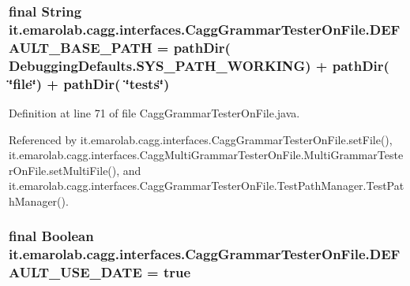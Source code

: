 \hypertarget{classit_1_1emarolab_1_1cagg_1_1interfaces_1_1CaggGrammarTesterOnFile_a2ab3d8af62c461ca52a0d174d6e0ed42}{
\subsubsection[{D\-E\-F\-A\-U\-L\-T\-\_\-\-B\-A\-S\-E\-\_\-\-P\-A\-T\-H}]{\setlength{\rightskip}{0pt plus 5cm}final String it.\-emarolab.\-cagg.\-interfaces.\-Cagg\-Grammar\-Tester\-On\-File.\-D\-E\-F\-A\-U\-L\-T\-\_\-\-B\-A\-S\-E\-\_\-\-P\-A\-T\-H = {\bf path\-Dir}( {\bf Debugging\-Defaults.\-S\-Y\-S\-\_\-\-P\-A\-T\-H\-\_\-\-W\-O\-R\-K\-I\-N\-G}) + {\bf path\-Dir}( \char`\"{}file\char`\"{}) + path\-Dir( \char`\"{}tests\char`\"{})\hspace{0.3cm}{\ttfamily [static]}}}\label{classit_1_1emarolab_1_1cagg_1_1interfaces_1_1CaggGrammarTesterOnFile_a2ab3d8af62c461ca52a0d174d6e0ed42}


Definition at line 71 of file Cagg\-Grammar\-Tester\-On\-File.\-java.



Referenced by it.\-emarolab.\-cagg.\-interfaces.\-Cagg\-Grammar\-Tester\-On\-File.\-set\-File(), it.\-emarolab.\-cagg.\-interfaces.\-Cagg\-Multi\-Grammar\-Tester\-On\-File.\-Multi\-Grammar\-Tester\-On\-File.\-set\-Multi\-File(), and it.\-emarolab.\-cagg.\-interfaces.\-Cagg\-Grammar\-Tester\-On\-File.\-Test\-Path\-Manager.\-Test\-Path\-Manager().

\hypertarget{classit_1_1emarolab_1_1cagg_1_1interfaces_1_1CaggGrammarTesterOnFile_a91c37e480e447587dd2562391b10ffb2}{
\subsubsection[{D\-E\-F\-A\-U\-L\-T\-\_\-\-U\-S\-E\-\_\-\-D\-A\-T\-E}]{\setlength{\rightskip}{0pt plus 5cm}final Boolean it.\-emarolab.\-cagg.\-interfaces.\-Cagg\-Grammar\-Tester\-On\-File.\-D\-E\-F\-A\-U\-L\-T\-\_\-\-U\-S\-E\-\_\-\-D\-A\-T\-E = true\hspace{0.3cm}{\ttfamily [static]}}}\label{classit_1_1emarolab_1_1cagg_1_1interfaces_1_1CaggGrammarTesterOnFile_a91c37e480e447587dd2562391b10ffb2}


